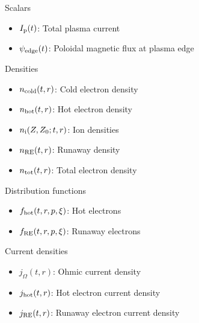 \documentclass[titleunderline,widescreen1610]{chalmerspresentation}
\newcommand{\DREAM}{\textsc{Dream}}
\newcommand{\fhot}{f_{\rm hot}}
\newcommand{\fre}{f_{\rm RE}}
\newcommand{\Ip}{I_{\rm p}}
\newcommand{\ncold}{n_{\rm cold}}
\newcommand{\nhot}{n_{\rm hot}}
\newcommand{\ions}{n_{\rm i}}
\newcommand{\nre}{n_{\rm RE}}
\newcommand{\ntot}{n_{\rm tot}}
\newcommand{\jhot}{j_{\rm hot}}
\newcommand{\jre}{j_{\rm RE}}
\newcommand{\johm}{j_{\Omega}}
\newcommand{\psiedge}{\psi_{\rm edge}}
\begin{document}
    \begin{frame}%
        \begin{minipage}{0.48\textwidth}%
            \begin{block}{Scalars}
                \begin{itemize}
                    \item $\Ip(t)$: Total plasma current
                    \item $\psiedge(t)$: Poloidal magnetic flux at plasma edge
                \end{itemize}
            \end{block}
            \begin{block}{Densities}
                \begin{itemize}
                    \item $\ncold(t,r)$: Cold electron density
                    \item $\nhot(t,r)$: Hot electron density
                    \item $\ions(Z,Z_0;t,r)$: Ion densities
                    \item $\nre(t,r)$: Runaway density
                    \item $\ntot(t,r)$: Total electron density
                \end{itemize}
            \end{block}
            \begin{block}{Distribution functions}
                \begin{itemize}
                    \item $\fhot(t,r,p,\xi)$: Hot electrons
                    \item $\fre(t,r,p,\xi)$: Runaway electrons
                \end{itemize}
            \end{block}
        \end{minipage}%
        \hfill%
        \begin{minipage}{0.48\textwidth}%
            \begin{block}{Current densities}
                \begin{itemize}
                    \item $\johm(t,r)$: Ohmic current density
                    \item $\jhot(t,r)$: Hot electron current density
                    \item $\jre(t,r)$: Runaway electron current density

\end{itemize}
\end{block}
\end{minipage}
\end{frame}
\end{document}
